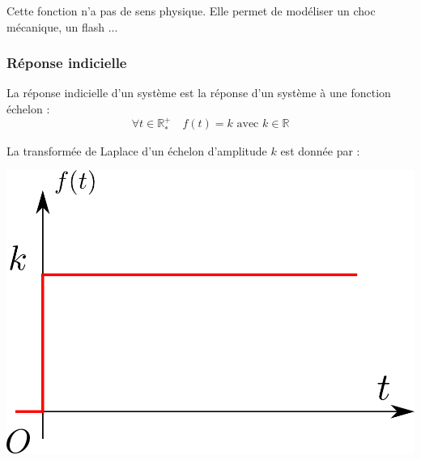\documentclass[11pt,oneside]{article}
\begin{document}
Cette fonction n'a pas de sens physique. Elle permet de modéliser un choc mécanique, un flash ...



\subsubsection*{Réponse indicielle}
\begin{minipage}[c]{.6\linewidth}
\begin{defi}
La réponse indicielle d'un système est la réponse d'un système à une fonction échelon :
$$ \forall t \in \mathbb{R}^+_* \quad f(t)=k \text{ avec } k\in\mathbb{R}$$

La transformée de Laplace d'un échelon d'amplitude $k$ est donnée par :

\end{defi}
\end{minipage} \hfill
\begin{minipage}[c]{.35\linewidth}
\begin{center}
\includegraphics[width=.9\textwidth]{png/echelon}
\end{center}
\end{minipage}
\end{document}
